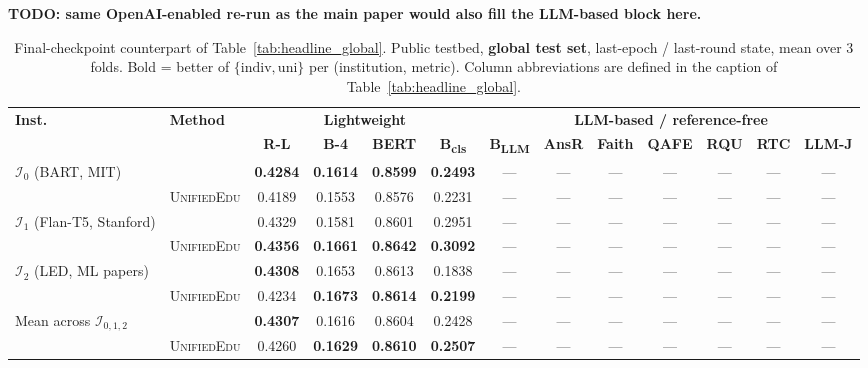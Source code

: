 \documentclass[11pt]{article}
\theoremstyle{plain}
\theoremstyle{definition}
\theoremstyle{remark}
\newcommand{\red}[1]{\textcolor{myred}{\textbf{#1}}}
\newcommand{\UniEdu}{\textsc{UnifiedEdu}}
\newcommand{\indiv}{\text{indiv}}
\newcommand{\uni}{\text{uni}}
\begin{document}
\red{TODO: same OpenAI-enabled re-run as the main paper would also fill the LLM-based block here.}
\begin{table}[t]
\centering
\footnotesize
\setlength{\tabcolsep}{2pt}
\caption{Final-checkpoint counterpart of
Table~\ref{tab:headline_global}. Public testbed,
\textbf{global test set}, last-epoch / last-round
state, mean over 3 folds. Bold = better of
$\{\indiv, \uni\}$ per (institution, metric).
Column abbreviations are defined in the caption of
Table~\ref{tab:headline_global}.}
\label{tab:appendix_global_final}
\begin{tabular}{ll cccc ccccccc}
\toprule
\multirow{2}{*}{\textbf{Inst.}} &
\multirow{2}{*}{\textbf{Method}} &
\multicolumn{4}{c}{\textbf{Lightweight}} &
\multicolumn{7}{c}{\textbf{LLM-based / reference-free}} \\
\cmidrule(lr){3-6} \cmidrule(lr){7-13}
& &
\textbf{R-L} & \textbf{B-4} & \textbf{BERT} & \textbf{B\textsubscript{cls}} &
\textbf{B\textsubscript{LLM}} & \textbf{AnsR} & \textbf{Faith} & \textbf{QAFE} &
\textbf{RQU} & \textbf{RTC} & \textbf{LLM-J} \\
\midrule
\multirow{2}{*}{$\mathcal{I}_0$ (BART, MIT)}
  & \indiv     & \textbf{0.4284} & \textbf{0.1614} & \textbf{0.8599} & \textbf{0.2493} & --- & --- & --- & --- & --- & --- & --- \\
  & \UniEdu{}  & 0.4189 & 0.1553 & 0.8576 & 0.2231 & --- & --- & --- & --- & --- & --- & --- \\
\multirow{2}{*}{$\mathcal{I}_1$ (Flan-T5, Stanford)}
  & \indiv     & 0.4329 & 0.1581 & 0.8601 & 0.2951 & --- & --- & --- & --- & --- & --- & --- \\
  & \UniEdu{}  & \textbf{0.4356} & \textbf{0.1661} & \textbf{0.8642} & \textbf{0.3092} & --- & --- & --- & --- & --- & --- & --- \\
\multirow{2}{*}{$\mathcal{I}_2$ (LED, ML papers)}
  & \indiv     & \textbf{0.4308} & 0.1653 & 0.8613 & 0.1838 & --- & --- & --- & --- & --- & --- & --- \\
  & \UniEdu{}  & 0.4234 & \textbf{0.1673} & \textbf{0.8614} & \textbf{0.2199} & --- & --- & --- & --- & --- & --- & --- \\
\multirow{2}{*}{Mean across $\mathcal{I}_{0,1,2}$}
  & \indiv     & \textbf{0.4307} & 0.1616 & 0.8604 & 0.2428 & --- & --- & --- & --- & --- & --- & --- \\
  & \UniEdu{}  & 0.4260 & \textbf{0.1629} & \textbf{0.8610} & \textbf{0.2507} & --- & --- & --- & --- & --- & --- & --- \\
\bottomrule
\end{tabular}
\end{table}
\end{document}
